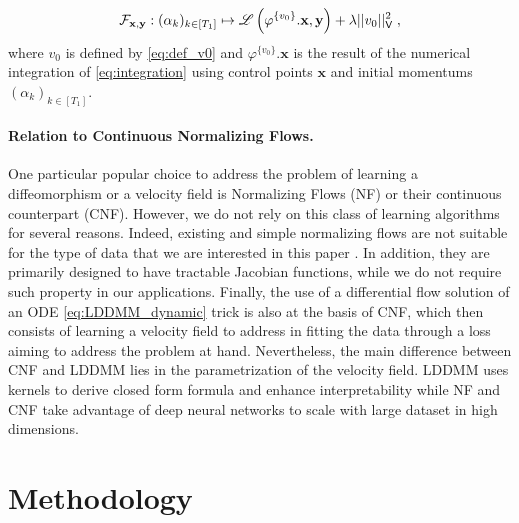 \begin{equation}
  \label{eq:relaxation}
  \mathcal{F}_{\mathbf{x},\mathbf{y}}: (\alpha_k)_{k\in [T_1]}\mapsto \mathscr{L}\left(\varphi^{\{v_0\}}.\mathbf{x},\mathbf{y}\right)+\lambda||v_0||_{\mathsf{V}}^2 \;,  
\end{equation}
where $v_0$ is defined by \eqref{eq:def_v0} and $\varphi^{\{v_0\}}.\mathbf{x}$ is the result of the numerical integration of \eqref{eq:integration} using control points $\mathbf{x}$ and initial momentums $(\alpha_k)_{k\in[T_1]} $. 

\vspace{-1ex}
\paragraph{Relation to Continuous Normalizing Flows.}
One particular popular choice to address the problem of learning a diffeomorphism or a velocity field is Normalizing Flows \cite{rezende2015variational,kobyzev2020normalizing} (NF) or their continuous counterpart \cite{chen2018neural,grathwohl2019scalable,salman2018deep} (CNF). However, we do not rely on this class of learning algorithms for several reasons. Indeed, existing and simple normalizing flows are not suitable for the type of data that we are interested in this paper \cite{feng2023multi,deng2020modeling}. In addition,  they are primarily designed to have tractable Jacobian functions, while we do not require such property in our applications. Finally, the use of a differential flow solution of an ODE \eqref{eq:LDDMM_dynamic} trick is also at the basis of CNF, which then consists of learning a velocity field to address in fitting the data through a loss aiming to address the problem at hand. Nevertheless, the main difference between CNF and LDDMM lies in the parametrization of the velocity field. LDDMM uses kernels to derive closed form formula and enhance interpretability while NF and CNF take advantage of deep neural networks to scale with large dataset in high dimensions.

\vspace{-1ex}
\section{Methodology}
\label{section:methodology}
\vspace{-1ex}

